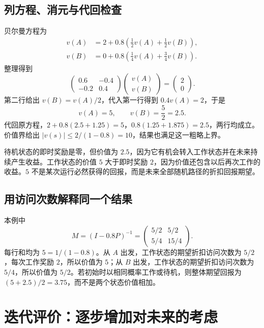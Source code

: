 \documentclass[UTF8,12pt,a4paper,fontset=fandol]{ctexart}
\begin{document}
\subsection{列方程、消元与代回检查}

贝尔曼方程为
\begin{equation}
  \begin{aligned}
    v(A)&=2+0.8\left(\frac12v(A)+\frac12v(B)\right),\\
    v(B)&=0+0.8\left(\frac14v(A)+\frac34v(B)\right).
  \end{aligned}
  \label{eq:mrp-example-bellman}
\end{equation}
整理得到
\[
  \begin{pmatrix}0.6&-0.4\\-0.2&0.4\end{pmatrix}
  \begin{pmatrix}v(A)\\v(B)\end{pmatrix}
  =\begin{pmatrix}2\\0\end{pmatrix}.
\]
第二行给出 $v(B)=v(A)/2$，代入第一行得到 $0.4v(A)=2$，于是
\begin{equation}
  v(A)=5,\qquad v(B)=\frac52=2.5.
  \label{eq:mrp-example-answer}
\end{equation}
代回原方程，$2+0.8(2.5+1.25)=5$，$0.8(1.25+1.875)=2.5$，两行均成立。价值界给出 $|v(s)|\leq2/(1-0.8)=10$，结果也满足这一粗略上界。

待机状态的即时奖励是零，但价值为 $2.5$，因为它有机会转入工作状态并在未来持续产生收益。工作状态的价值 $5$ 大于即时奖励 $2$，因为价值还包含以后再次工作的收益。$5$ 不是某次运行必然获得的回报，而是未来全部随机路径的折扣回报期望。

\subsection{用访问次数解释同一个结果}

本例中
\[
  M=(I-0.8P)^{-1}
   =\begin{pmatrix}5/2&5/2\\5/4&15/4\end{pmatrix}.
\]
每行和均为 $5=1/(1-0.8)$。从 $A$ 出发，工作状态的期望折扣访问次数为 $5/2$，每次工作奖励 $2$，所以价值为 $5$；从 $B$ 出发，工作状态的期望折扣访问次数为 $5/4$，所以价值为 $5/2$。若初始时以相同概率工作或待机，则整体期望回报为 $(5+2.5)/2=3.75$，而不是两个状态价值相加。

\section{迭代评价：逐步增加对未来的考虑}
\label{sec:mrp-iteration}
\end{document}
